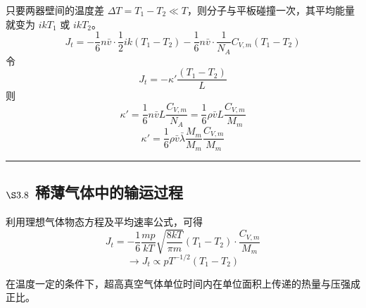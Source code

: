 \documentclass{ctexart}
\begin{document}
只要两器壁间的温度差 $\Delta T = T_1 - T_2 \ll T$，则分子与平板碰撞一次，其平均能量就变为 $ikT_1$ 或 $ikT_2$。
$$
J_t = -\frac{1}{6} n \bar{v} \cdot \frac{1}{2} ik(T_1 - T_2) - \frac{1}{6} n \bar{v} \cdot \frac{1}{N_A} C_{V, m} (T_1 - T_2)
$$
令
$$
J_t = -\kappa' \frac{(T_1 - T_2)}{L}
$$
则
$$
\kappa' = \frac{1}{6} n \bar{v} L \frac{C_{V, m}}{N_A} = \frac{1}{6} \rho \bar{v} L \frac{C_{V, m}}{M_m}
$$
$$
\kappa' = \frac{1}{6} \rho \bar{v} \bar{\lambda} \frac{M_m}{M_m} \frac{C_{V, m}}{M_m}
$$

\hrule
\vspace{1em} %

\subsection*{$\S 3.8$ 稀薄气体中的输运过程}

利用理想气体物态方程及平均速率公式，可得
$$
J_t = -\frac{1}{6} \frac{m p}{k T} \sqrt{\frac{8 k T}{\pi m}} (T_1 - T_2) \cdot \frac{C_{V, m}}{M_m}
$$
$$
\longrightarrow J_t \propto p T^{-1/2} (T_1 - T_2)
$$

在温度一定的条件下，超高真空气体单位时间内在单位面积上传递的热量与压强成正比。
\end{document}

